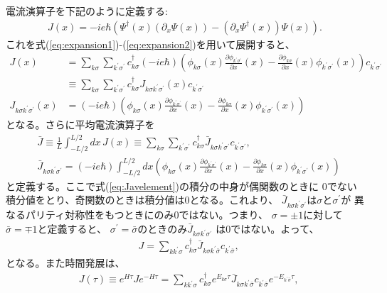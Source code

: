 \documentclass[10pt,a4j]{jarticle}
\begin{document}
電流演算子を下記のように定義する:
\begin{align}
J(x) = - ie\hbar \left(\Psi^{\dagger}(x) (\partial_x \Psi(x)) - (\partial_x \Psi^{\dagger}(x))\Psi(x) \right).
\label{eq:Jdef}
\end{align}
これを式(\ref{eq:expansion1})-(\ref{eq:expansion2})を用いて展開すると、
\begin{align}
J(x) &= \sum_{k\sigma} \sum_{k^\prime \sigma^\prime} c_{k\sigma}^{\dagger}
(- ie\hbar)\left(
\phi_{k\sigma}(x) \frac{\partial \phi_{k^\prime\sigma^\prime}}{\partial x}(x) 
- \frac{\partial \phi_{k\sigma}}{\partial x}(x) \phi_{k^\prime \sigma^\prime}(x)
\right) c_{k^\prime \sigma^\prime} \nonumber \\
& \equiv \sum_{k\sigma} \sum_{k^\prime \sigma^\prime} c_{k\sigma}^{\dagger}
J_{k\sigma k^\prime \sigma^\prime}(x) c_{k^\prime \sigma^\prime} \\
J_{k\sigma k^\prime \sigma^\prime}(x) & = 
(- ie\hbar)\left(
\phi_{k\sigma}(x) \frac{\partial \phi_{k^\prime\sigma^\prime}}{\partial x}(x) 
- \frac{\partial \phi_{k\sigma}}{\partial x}(x) \phi_{k^\prime \sigma^\prime}(x)
\right) 
\end{align}
となる。さらに平均電流演算子を
\begin{align}
& \bar{J} \equiv \frac{1}{L} \int_{-L/2}^{L/2} dx \, J(x) 
\equiv \sum_{k\sigma} \sum_{k^\prime \sigma^\prime} c_{k\sigma}^{\dagger}
\bar{J}_{k\sigma k^\prime \sigma^\prime} c_{k^\prime \sigma^\prime}, \\
& \bar{J}_{k\sigma k^\prime \sigma^\prime} =
(- ie\hbar)\int_{-L/2}^{L/2} dx 
\left(
\phi_{k\sigma}(x) \frac{\partial \phi_{k^\prime\sigma^\prime}}{\partial x}(x) 
- \frac{\partial \phi_{k\sigma}}{\partial x}(x) \phi_{k^\prime \sigma^\prime}(x)
\right) \label{eq:Javelement}
\end{align}
と定義する。ここで式(\ref{eq:Javelement})の積分の中身が偶関数のときに
0でない積分値をとり、奇関数のときは積分値は0となる。これより、
$\bar{J}_{k\sigma k^\prime \sigma^\prime}$は$\sigma$と$\sigma^\prime$が
異なるパリティ対称性をもつときにのみ0ではない。つまり、
$\sigma=\pm 1$に対して$\bar{\sigma} = \mp 1$と定義すると、
$\sigma^{\prime} = \bar{\sigma}$のときのみ$\bar{J}_{k\sigma k^\prime \sigma^\prime}$
は0ではない。よって、
\begin{align}
& J = \sum_{kk^\prime\sigma} c_{k\sigma}^{\dagger}
\bar{J}_{k\sigma k^\prime \bar{\sigma}} c_{k^\prime \bar{\sigma}}, 
\label{eq:Jcalc}
\end{align}
となる。また時間発展は、
\begin{align}
& J(\tau) \equiv e^{H \tau} J e^{-H \tau} = 
\sum_{kk^\prime\sigma} c_{k\sigma}^{\dagger} e^{E_{k\sigma} \tau}
\bar{J}_{k\sigma k^\prime \bar{\sigma}} c_{k^\prime \bar{\sigma}} e^{-E_{k^\prime \bar{\sigma}} \tau}, 
\label{eq:Jtaucalc}
\end{align}
\end{document}
